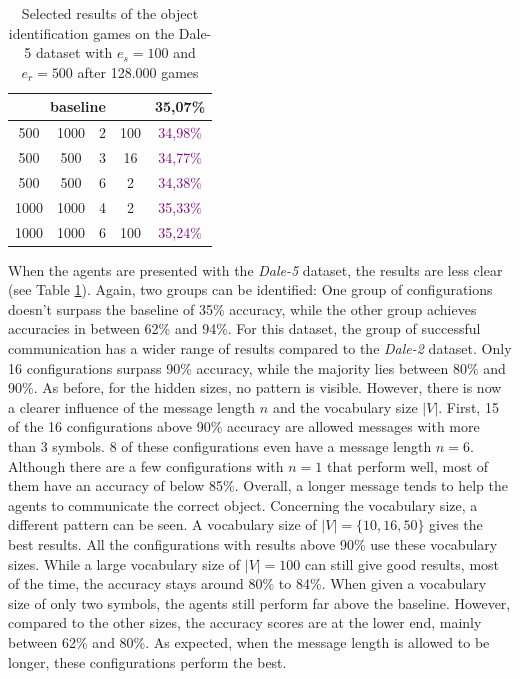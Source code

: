 \begin{table}[ht]
\begin{tabular}{cccc|c}
        \multicolumn{4}{c|}{baseline} & {35,07\%}                                                     \\\midrule
        {500}                         & {1000}    & {2} & {100} & \textcolor{purple}{34,98\%}         \\
        {500}                         & {500}     & {3} & {16}  & \textcolor{purple}{34,77\%}         \\
        {500}                         & {500}     & {6} & {2}   & \textcolor{purple}{34,38\%}         \\
        {1000}                        & {1000}    & {4} & {2}   & \textcolor{purple}{35,33\%}         \\
        {1000}                        & {1000}    & {6} & {100} & \textcolor{purple}{35,24\%}         \\
        \bottomrule
    \end{tabular}
    \caption{Selected results of the object identification games on the Dale-5 dataset with $e_s=100$ and $e_r=500$ after 128.000 games}
    \label{tab:results_discriminator_dale-5}
\end{table}

When the agents are presented with the \emph{Dale-5} dataset, the results are less clear (see Table \ref{tab:results_discriminator_dale-5}).
Again, two groups can be identified: One group of configurations doesn't surpass the baseline of 35\% accuracy, while the other group achieves accuracies in between 62\% and 94\%.
For this dataset, the group of successful communication has a wider range of results compared to the \emph{Dale-2} dataset.
Only 16 configurations surpass 90\% accuracy, while the majority lies between 80\% and 90\%.
As before, for the hidden sizes, no pattern is visible.
However, there is now a clearer influence of the message length $n$ and the vocabulary size $|V|$.
First, 15 of the 16 configurations above 90\% accuracy are allowed messages with more than 3 symbols.
8 of these configurations even have a message length $n = 6$.
Although there are a few configurations with $n = 1$ that perform well, most of them have an accuracy of below 85\%.
Overall, a longer message tends to help the agents to communicate the correct object.
Concerning the vocabulary size, a different pattern can be seen.
A vocabulary size of $|V| = \{10,16,50\}$ gives the best results.
All the configurations with results above 90\% use these vocabulary sizes.
While a large vocabulary size of $|V| = 100$ can still give good results, most of the time, the accuracy stays around 80\% to 84\%.
When given a vocabulary size of only two symbols, the agents still perform far above the baseline.
However, compared to the other sizes, the accuracy scores are at the lower end, mainly between 62\% and 80\%.
As expected, when the message length is allowed to be longer, these configurations perform the best.


